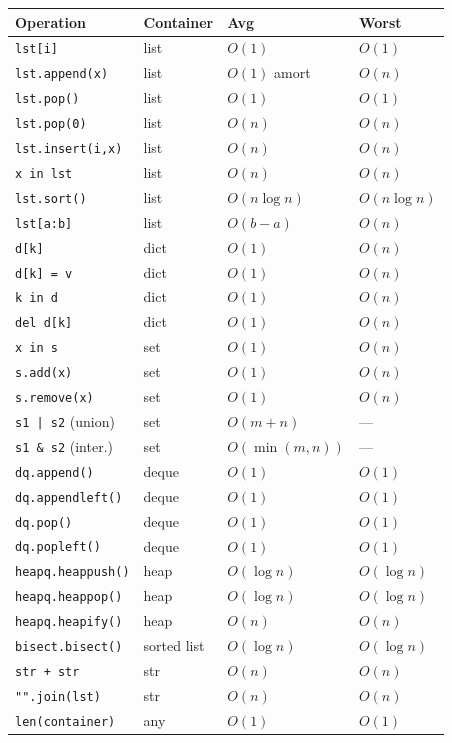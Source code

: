 \documentclass[11pt,a4paper]{report}
\begin{document}
\begin{longtable}{@{}llll@{}}
\toprule
\textbf{Operation} & \textbf{Container} & \textbf{Avg} & \textbf{Worst} \\
\midrule
\endhead
\texttt{lst[i]}              & list    & $O(1)$        & $O(1)$ \\
\texttt{lst.append(x)}       & list    & $O(1)$ amort  & $O(n)$ \\
\texttt{lst.pop()}           & list    & $O(1)$        & $O(1)$ \\
\texttt{lst.pop(0)}          & list    & $O(n)$        & $O(n)$ \\
\texttt{lst.insert(i,x)}     & list    & $O(n)$        & $O(n)$ \\
\texttt{x in lst}            & list    & $O(n)$        & $O(n)$ \\
\texttt{lst.sort()}          & list    & $O(n\log n)$  & $O(n\log n)$ \\
\texttt{lst[a:b]}            & list    & $O(b{-}a)$    & $O(n)$ \\
\texttt{d[k]}                & dict    & $O(1)$        & $O(n)$ \\
\texttt{d[k] = v}            & dict    & $O(1)$        & $O(n)$ \\
\texttt{k in d}              & dict    & $O(1)$        & $O(n)$ \\
\texttt{del d[k]}            & dict    & $O(1)$        & $O(n)$ \\
\texttt{x in s}              & set     & $O(1)$        & $O(n)$ \\
\texttt{s.add(x)}            & set     & $O(1)$        & $O(n)$ \\
\texttt{s.remove(x)}         & set     & $O(1)$        & $O(n)$ \\
\texttt{s1 | s2} (union)     & set     & $O(m{+}n)$    & --- \\
\texttt{s1 \& s2} (inter.)   & set     & $O(\min(m,n))$& --- \\
\texttt{dq.append()}         & deque   & $O(1)$        & $O(1)$ \\
\texttt{dq.appendleft()}     & deque   & $O(1)$        & $O(1)$ \\
\texttt{dq.pop()}            & deque   & $O(1)$        & $O(1)$ \\
\texttt{dq.popleft()}        & deque   & $O(1)$        & $O(1)$ \\
\texttt{heapq.heappush()}    & heap    & $O(\log n)$   & $O(\log n)$ \\
\texttt{heapq.heappop()}     & heap    & $O(\log n)$   & $O(\log n)$ \\
\texttt{heapq.heapify()}     & heap    & $O(n)$        & $O(n)$ \\
\texttt{bisect.bisect()}     & sorted list & $O(\log n)$ & $O(\log n)$ \\
\texttt{str + str}           & str     & $O(n)$        & $O(n)$ \\
\texttt{"".join(lst)}        & str     & $O(n)$        & $O(n)$ \\
\texttt{len(container)}      & any     & $O(1)$        & $O(1)$ \\
\bottomrule
\end{longtable}
\end{document}
